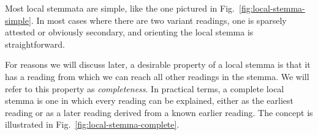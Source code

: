 \documentclass[a4paper, 12pt]{article}
\begin{document}
	
	Most local stemmata are simple, like the one pictured in Fig.~\ref{fig:local-stemma-simple}. In most cases where there are two variant readings, one is sparsely attested or obviously secondary, and orienting the local stemma is straightforward.
	
	\newpage
	
	For reasons we will discuss later, a desirable property of a local stemma is that it has a reading from which we can reach all other readings in the stemma. We will refer to this property as \emph{completeness}. In practical terms, a complete local stemma is one in which every reading can be explained, either as the earliest reading or as a later reading derived from a known earlier reading. The concept is illustrated in Fig.~\ref{fig:local-stemma-complete}.
	
\end{document}
